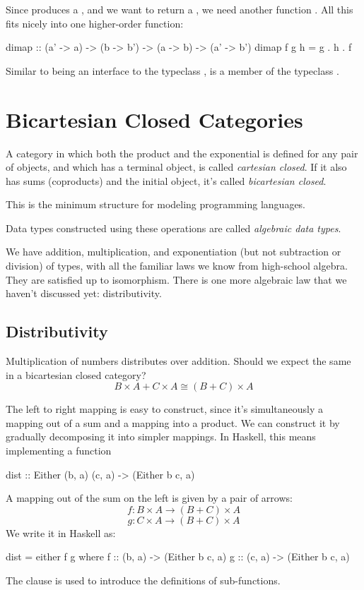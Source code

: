 \documentclass[DaoFP]{subfiles}
\begin{document}
Since  produces a , and we want to return a , we need another function . All this fits nicely into one higher-order function:
\begin{haskell}
dimap :: (a' -> a) -> (b -> b') -> (a -> b) -> (a' -> b')
dimap f g h = g . h . f
\end{haskell}
Similar to  being an interface to the typeclass ,  is a member of the typeclass .

\section{Bicartesian Closed Categories}

A category in which both the product and the exponential is defined for any pair of objects, and which has a terminal object, is called \emph{cartesian closed}. If it also has sums (coproducts) and the initial object, it's called \emph{bicartesian closed}. 

This is the minimum structure for modeling programming languages. 

Data types constructed using these operations are called \emph{algebraic data types}.

We have addition, multiplication, and exponentiation (but not subtraction or division) of types, with all the familiar laws we know from high-school algebra. They are satisfied up to isomorphism. There is one more algebraic law that we haven't discussed yet: distributivity.

\subsection{Distributivity}

Multiplication of numbers distributes over addition. Should we expect the same in a bicartesian closed category?
\[B \times A + C \times A \cong (B + C) \times A\]

The left to right mapping is easy to construct, since it's simultaneously a mapping out of a sum and a mapping into a product. We can construct it by gradually decomposing it into simpler mappings. In Haskell, this means implementing a function
\begin{haskell}
dist :: Either (b, a) (c, a) -> (Either b c, a)
\end{haskell}
A mapping out of the sum on the left is given by a pair of arrows:
\[f \colon B\times A \to (B + C) \times A \]
\[g \colon C\times A \to (B + C) \times A \]
We write it in Haskell as:
\begin{haskell}
dist = either f g
  where
    f   :: (b, a) -> (Either b c, a)
    g   :: (c, a) -> (Either b c, a)
\end{haskell}
The  clause is used to introduce the definitions of sub-functions.
\end{document}
